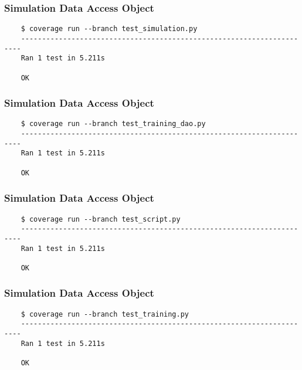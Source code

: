 \documentclass[a4paper,11pt]{article}
\begin{document}
\subsubsection*{{\hspace{6mm}}Simulation Data Access Object}
\begin{verbatim}
    $ coverage run --branch test_simulation.py
    ----------------------------------------------------------------------
    Ran 1 test in 5.211s

    OK
\end{verbatim}

\subsubsection*{{\hspace{6mm}}Simulation Data Access Object}
\begin{verbatim}
    $ coverage run --branch test_training_dao.py
    ----------------------------------------------------------------------
    Ran 1 test in 5.211s

    OK
\end{verbatim}

\subsubsection*{{\hspace{6mm}}Simulation Data Access Object}
\begin{verbatim}
    $ coverage run --branch test_script.py
    ----------------------------------------------------------------------
    Ran 1 test in 5.211s

    OK
\end{verbatim}

\subsubsection*{{\hspace{6mm}}Simulation Data Access Object}
\begin{verbatim}
    $ coverage run --branch test_training.py
    ----------------------------------------------------------------------
    Ran 1 test in 5.211s

    OK
\end{verbatim}
    
\end{document}
